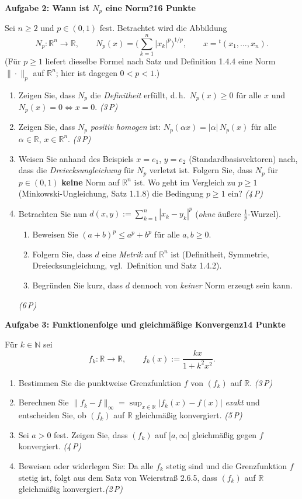 \documentclass[a4paper,12pt]{article}
\newcommand{\pkt}[1]{\hfill\textit{(#1\,P)}}
\newcommand{\aufgabe}[3]{%
  \bigskip\par\noindent\textbf{Aufgabe #1: #2}\hfill\textbf{#3 Punkte}%
  \par\nobreak\medskip}
\begin{document}
\aufgabe{2}{Wann ist $N_p$ eine Norm?}{16}

Sei $n\ge 2$ und $p\in(0,1)$ fest. Betrachtet wird die Abbildung
\[
N_p:\mathbb{R}^n\to\mathbb{R},\qquad
N_p(x)=\Big(\sum_{k=1}^n |x_k|^p\Big)^{1/p},\qquad x={}^t(x_1,\dots,x_n).
\]
(Für $p\ge 1$ liefert dieselbe Formel nach Satz und Definition 1.4.4 eine Norm $\|\cdot\|_p$ auf $\mathbb{R}^n$; hier ist dagegen $0<p<1$.)
\begin{enumerate}[label=\alph*)]
  \item Zeigen Sie, dass $N_p$ die \emph{Definitheit} erfüllt, d.\,h.\ $N_p(x)\ge 0$ für alle $x$ und $N_p(x)=0\iff x=0$. \pkt{3}
  \item Zeigen Sie, dass $N_p$ \emph{positiv homogen} ist: $N_p(\alpha x)=|\alpha|\,N_p(x)$ für alle $\alpha\in\mathbb{R}$, $x\in\mathbb{R}^n$. \pkt{3}
  \item Weisen Sie anhand des Beispiels $x=e_1$, $y=e_2$ (Standardbasisvektoren) nach, dass die \emph{Dreiecksungleichung} für $N_p$ verletzt ist. Folgern Sie, dass $N_p$ für $p\in(0,1)$ \textbf{keine} Norm auf $\mathbb{R}^n$ ist. Wo geht im Vergleich zu $p\ge 1$ (Minkowski-Ungleichung, Satz 1.1.8) die Bedingung $p\ge 1$ ein? \pkt{4}
  \item Betrachten Sie nun $\displaystyle d(x,y):=\sum_{k=1}^n |x_k-y_k|^p$ (\emph{ohne} äußere $\tfrac1p$-Wurzel).
  \begin{enumerate}[label=(\roman*)]
    \item Beweisen Sie $(a+b)^p\le a^p+b^p$ für alle $a,b\ge 0$.
    \item Folgern Sie, dass $d$ eine \emph{Metrik} auf $\mathbb{R}^n$ ist (Definitheit, Symmetrie, Dreiecksungleichung, vgl.\ Definition und Satz 1.4.2).
    \item Begründen Sie kurz, dass $d$ dennoch von \emph{keiner} Norm erzeugt sein kann.
  \end{enumerate}
  \pkt{6}
\end{enumerate}

\aufgabe{3}{Funktionenfolge und gleichmäßige Konvergenz}{14}

Für $k\in\mathbb{N}$ sei
\[f_k:\mathbb{R}\to\mathbb{R},\qquad f_k(x):=\frac{kx}{1+k^2x^2}.\]
\begin{enumerate}[label=\alph*)]
  \item Bestimmen Sie die punktweise Grenzfunktion $f$ von $(f_k)$ auf $\mathbb{R}$. \pkt{3}
  \item Berechnen Sie $\|f_k-f\|_\infty=\sup_{x\in\mathbb{R}}|f_k(x)-f(x)|$ \emph{exakt} und entscheiden Sie, ob $(f_k)$ auf $\mathbb{R}$ gleichmäßig konvergiert. \pkt{5}
  \item Sei $a>0$ fest. Zeigen Sie, dass $(f_k)$ auf $[a,\infty[$ gleichmäßig gegen $f$ konvergiert. \pkt{4}
  \item Beweisen oder widerlegen Sie: \glqq Da alle $f_k$ stetig sind und die Grenzfunktion $f$ stetig ist, folgt aus dem Satz von Weierstraß 2.6.5, dass $(f_k)$ auf $\mathbb{R}$ gleichmäßig konvergiert.\grqq \pkt{2}
\end{enumerate}
\end{document}
